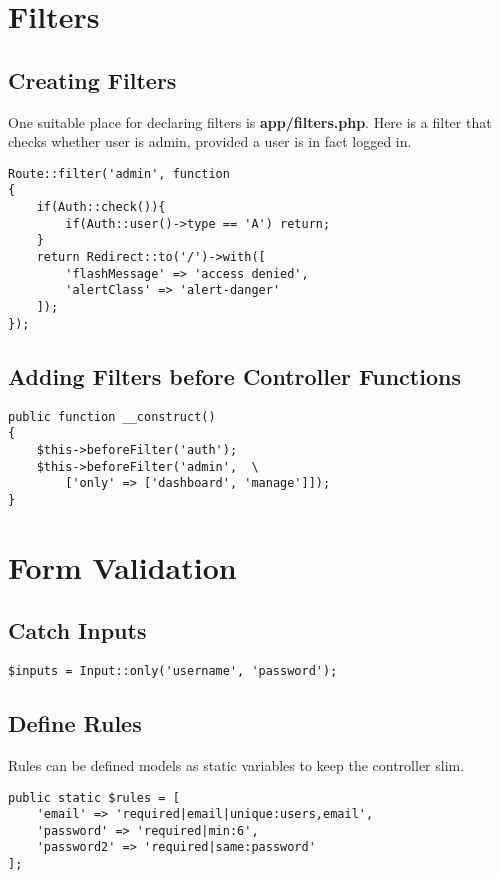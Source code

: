\documentclass[a4paper, 10pt]{article}
\begin{document}
\section{Filters}
\subsection{Creating Filters}
One suitable place for declaring filters is \textbf{app/filters.php}.
Here is a filter that checks whether user is admin, provided a user is
in fact logged in.
\begin{verbatim}
Route::filter('admin', function
{
    if(Auth::check()){
        if(Auth::user()->type == 'A') return;
    }
    return Redirect::to('/')->with([
        'flashMessage' => 'access denied',
        'alertClass' => 'alert-danger'
    ]);
});
\end{verbatim}
\subsection{Adding Filters before Controller Functions}
\begin{verbatim}
public function __construct()
{
    $this->beforeFilter('auth');
    $this->beforeFilter('admin',  \
        ['only' => ['dashboard', 'manage']]);
}
\end{verbatim}

\section{Form Validation}
\subsection{Catch Inputs}
\begin{verbatim}
$inputs = Input::only('username', 'password');
\end{verbatim}
\subsection{Define Rules}
Rules can be defined models as static variables to keep the controller slim.
\begin{verbatim}
public static $rules = [
    'email' => 'required|email|unique:users,email',
    'password' => 'required|min:6',
    'password2' => 'required|same:password'
];
\end{verbatim}
\end{document}
